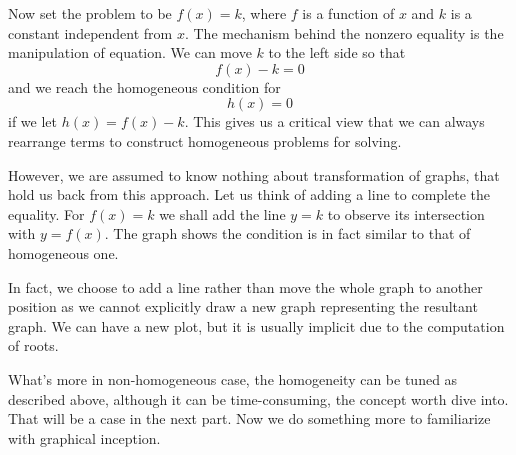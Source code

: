 \documentclass[12pt]{article}
\begin{document}
    Now set the problem to be $f(x)=k$, where $f$ is a function of $x$ and $k$ is a constant independent from $x$. The mechanism behind the nonzero equality is the manipulation of equation. We can move $k$ to the left side so that \[f(x)-k=0\] and we reach the homogeneous condition for \[h(x)=0\] if we let $h(x)=f(x)-k$. This gives us a critical view that we can always rearrange terms to construct homogeneous problems for solving.

    However, we are assumed to know nothing about transformation of graphs, that hold us back from this approach. Let us think of adding a line to complete the equality. For $f(x)=k$ we shall add the line $y=k$ to observe its intersection with $y=f(x)$. The graph shows the condition is in fact similar to that of homogeneous one.

    \begin{center}
    \end{center}

    In fact, we choose to add a line rather than move the whole graph to another position as we cannot explicitly draw a new graph representing the resultant graph. We can have a new plot, but it is usually implicit due to the computation of roots.

    What's more in non-homogeneous case, the homogeneity can be tuned as described above, although it can be time-consuming, the concept worth dive into. That will be a case in the next part. Now we do something more to familiarize with graphical inception.
\end{document}
